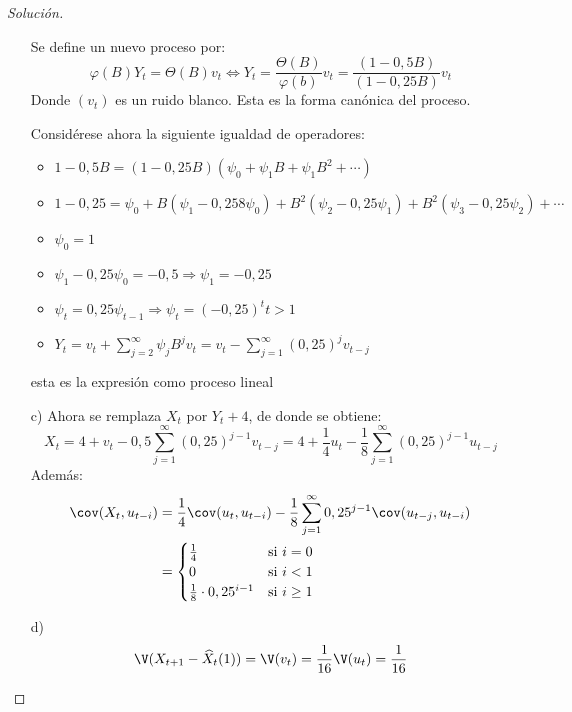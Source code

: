 \begin{ejemplo}
\begin{proof}[Soluci\'{o}n]
\begin{enumerate}
Se define un nuevo proceso por: 
\[
\varphi (B) Y_{t} =\Theta (B)v_{t} \Longleftrightarrow  Y_{t} =\frac{\Theta 
(B)}{\varphi (b)}v_{t} =\frac{(1-0,5B)}{(1-0,25B)}v_{t} 
\]
Donde $(v_{{t}})$ es un ruido blanco. Esta es la forma can\'{o}nica 
del proceso.

Consid\'{e}rese ahora la siguiente igualdad de operadores:
\begin{itemize}
 \item $1-0,5B=(1-0,25B)(\psi_{0} +\psi_{1} B+\psi_{1} B^{2}+\cdots)$
 \item $1-0,25=\psi_{0} +B(\psi_{1} -0,258\psi_{0} )+B^{2}(\psi_{2} -0,25\psi_{1})+B^{2}(\psi_{3} -0,25\psi_{2} )+\cdots$ 
 \item $\psi_{0} =1$
 \item $\psi_{1} -0,25\psi_{0} =-0,5\Rightarrow \psi_{1} =-0,25$
 \item $\psi_{t} =0,25\psi_{t-1}  \Longrightarrow \psi_{t} =(-0,25)^{t}t>1 $
 \item $Y_{t} =v_{t} +\sum_{j=2}^\infty {\psi_{j} B^{j}v_{t} } =v_{t} -\sum_{j=1}^\infty {(0,25)^{j}v_{t-j} }  $
\end{itemize}
esta es la expresi\'{o}n como proceso lineal


\item[c)] Ahora se remplaza $X_{t}$   por  $Y_{t} +4$, de donde se obtiene:
\[
X_{t} =4+v_{t} -0,5\sum_{j=1}^\infty {(0,25)^{j-1}v_{t-j} } 
=4+\frac{1}{4}u_{t} -\frac{1}{8}\sum_{j=1}^\infty 
{(0,25)^{j-1}u_{t-j} } 
\]
Adem\'{a}s: 
\begin{align*}
\cov(X_{t} ,u_{t-i} )
	&=\frac{1}{4}\cov(u_{t} ,u_{t-i})-\frac{1}{8}\sum_{j=1}^\infty {0,25^{j-1}} \cov(u_{t-j} ,u_{t-i} )\\
	&=\begin{cases}
	   \frac{1}{4} &\text{si } i=0\\
	   0 &\text{si } i<1\\
	   \frac{1}{8}\cdot 0,25^{i-1} &\text{si } i\ge 1
	  \end{cases}
\end{align*}

\item[d)]
\[
\V(X_{t+1} -\widehat{X}_{t} (1))=\V(v_{t} 
)=\frac{1}{16}\V(u_{t} )=\frac{1}{16}
\]
\end{enumerate}
\end{proof}
\end{ejemplo}


